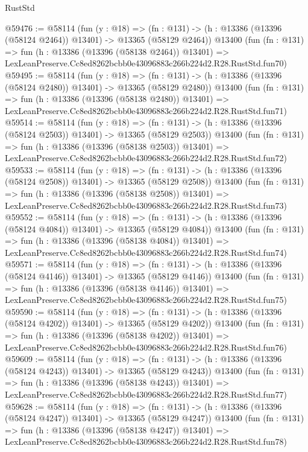 \begin{lexlean}{RustStd}
\begin{coremodule}
@59476 := @58114
    (fun (y : @18) =>
    (fn : @131) -> (h : @13386 (@13396 (@58124 @2464)) @13401) -> @13365 (@58129 @2464))
    @13400
    (fun (fn : @131) =>
    fun (h : @13386 (@13396 (@58138 @2464)) @13401) =>
    LexLeanPreserve.Cc8ed8262bcbb0e43096883c266b224d2.R28.RustStd.fun70)
@59495 := @58114
    (fun (y : @18) =>
    (fn : @131) -> (h : @13386 (@13396 (@58124 @2480)) @13401) -> @13365 (@58129 @2480))
    @13400
    (fun (fn : @131) =>
    fun (h : @13386 (@13396 (@58138 @2480)) @13401) =>
    LexLeanPreserve.Cc8ed8262bcbb0e43096883c266b224d2.R28.RustStd.fun71)
@59514 := @58114
    (fun (y : @18) =>
    (fn : @131) -> (h : @13386 (@13396 (@58124 @2503)) @13401) -> @13365 (@58129 @2503))
    @13400
    (fun (fn : @131) =>
    fun (h : @13386 (@13396 (@58138 @2503)) @13401) =>
    LexLeanPreserve.Cc8ed8262bcbb0e43096883c266b224d2.R28.RustStd.fun72)
@59533 := @58114
    (fun (y : @18) =>
    (fn : @131) -> (h : @13386 (@13396 (@58124 @2508)) @13401) -> @13365 (@58129 @2508))
    @13400
    (fun (fn : @131) =>
    fun (h : @13386 (@13396 (@58138 @2508)) @13401) =>
    LexLeanPreserve.Cc8ed8262bcbb0e43096883c266b224d2.R28.RustStd.fun73)
@59552 := @58114
    (fun (y : @18) =>
    (fn : @131) -> (h : @13386 (@13396 (@58124 @4084)) @13401) -> @13365 (@58129 @4084))
    @13400
    (fun (fn : @131) =>
    fun (h : @13386 (@13396 (@58138 @4084)) @13401) =>
    LexLeanPreserve.Cc8ed8262bcbb0e43096883c266b224d2.R28.RustStd.fun74)
@59571 := @58114
    (fun (y : @18) =>
    (fn : @131) -> (h : @13386 (@13396 (@58124 @4146)) @13401) -> @13365 (@58129 @4146))
    @13400
    (fun (fn : @131) =>
    fun (h : @13386 (@13396 (@58138 @4146)) @13401) =>
    LexLeanPreserve.Cc8ed8262bcbb0e43096883c266b224d2.R28.RustStd.fun75)
@59590 := @58114
    (fun (y : @18) =>
    (fn : @131) -> (h : @13386 (@13396 (@58124 @4202)) @13401) -> @13365 (@58129 @4202))
    @13400
    (fun (fn : @131) =>
    fun (h : @13386 (@13396 (@58138 @4202)) @13401) =>
    LexLeanPreserve.Cc8ed8262bcbb0e43096883c266b224d2.R28.RustStd.fun76)
@59609 := @58114
    (fun (y : @18) =>
    (fn : @131) -> (h : @13386 (@13396 (@58124 @4243)) @13401) -> @13365 (@58129 @4243))
    @13400
    (fun (fn : @131) =>
    fun (h : @13386 (@13396 (@58138 @4243)) @13401) =>
    LexLeanPreserve.Cc8ed8262bcbb0e43096883c266b224d2.R28.RustStd.fun77)
@59628 := @58114
    (fun (y : @18) =>
    (fn : @131) -> (h : @13386 (@13396 (@58124 @4247)) @13401) -> @13365 (@58129 @4247))
    @13400
    (fun (fn : @131) =>
    fun (h : @13386 (@13396 (@58138 @4247)) @13401) =>
    LexLeanPreserve.Cc8ed8262bcbb0e43096883c266b224d2.R28.RustStd.fun78)

\end{coremodule}
\end{lexlean}

